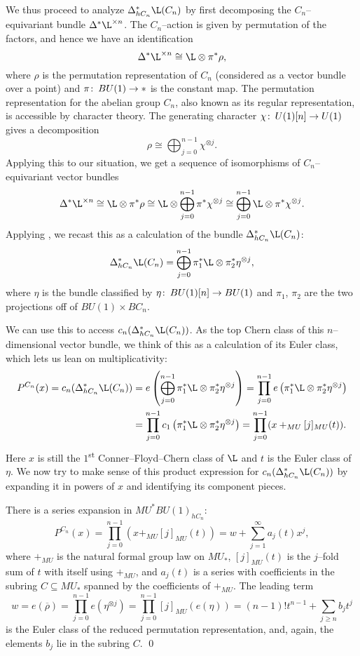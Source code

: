 We thus proceed to analyze \(\Delta^*_{hC_n} \L(C_n)\) by first decomposing the \(C_n\)--equivariant bundle \(\Delta^* \L^{\times n}\).  The \(C_n\)--action is given by permutation of the factors, and hence we have an identification \[\Delta^* \L^{\times n} \cong \L \otimes \pi^* \rho,\] where \(\rho\) is the permutation representation of \(C_n\) (considered as a vector bundle over a point) and \(\pi\colon\thinspace BU(1) \to *\) is the constant map.  The permutation representation for the abelian group \(C_n\), also known as its regular representation, is accessible by character theory.  The generating character \(\chi\colon\thinspace U(1)[n] \to U(1)\) gives a decomposition \[\rho \cong \bigoplus_{j=0}^{n-1} \chi^{\otimes j}.\]  Applying this to our situation, we get a sequence of isomorphisms of \(C_n\)--equivariant vector bundles \[\Delta^* \L^{\times n} \cong \L \otimes \pi^* \rho \cong \L \otimes \bigoplus_{j=0}^{n-1} \pi^* \chi^{\otimes j} \cong \bigoplus_{j=0}^{n-1} \L \otimes \pi^* \chi^{\otimes j}.\]  Applying , we recast this as a calculation of the bundle \(\Delta_{hC_n}^* \L(C_n)\): \[\Delta_{hC_n}^* \L(C_n) = \bigoplus_{j=0}^{n-1} \pi_1^* \L \otimes \pi_2^* \eta^{\otimes j},\] where \(\eta\) is the bundle classified by \(\eta\colon\thinspace BU(1)[n] \to BU(1)\) and \(\pi_1\), \(\pi_2\) are the two projections off of \(BU(1) \times BC_n\).

We can use this to access \(c_n(\Delta_{hC_n}^* \L(C_n))\).  As the top Chern class of this \(n\)--dimensional vector bundle, we think of this as a calculation of its Euler class, which lets us lean on multiplicativity:
\begin{align*}
P^{C_n}(x) = c_n(\Delta_{hC_n}^* \L(C_n)) & = e\left( \bigoplus_{j=0}^{n-1} \pi_1^* \L \otimes \pi_2^* \eta^{\otimes j} \right)
= \prod_{j=0}^{n-1} e\left( \pi_1^* \L \otimes \pi_2^* \eta^{\otimes j} \right) \\
& = \prod_{j=0}^{n-1} c_1\left( \pi_1^* \L \otimes \pi_2^* \eta^{\otimes j} \right)
= \prod_{j=0}^{n-1} (x +_{MU} [j]_{MU}(t)).
\end{align*}
Here \(x\) is still the \(1\)\textsuperscript{st} Conner--Floyd--Chern class of \(\L\) and \(t\) is the Euler class of \(\eta\).  We now try to make sense of this product expression for \(c_n(\Delta_{hC_n}^* \L(C_n))\) by expanding it in powers of \(x\) and identifying its component pieces.
\begin{lemma}\label{AjAndBjAreInTheFGLSubring}
There is a series expansion in \(MU^* BU(1)_{hC_n}\): \[P^{C_n}(x) = \prod_{j=0}^{n-1} (x +_{MU} [j]_{MU}(t)) = w + \sum_{j=1}^\infty a_j(t) x^j,\] where \(+_{MU}\) is the natural formal group law on \(MU_*\), \([j]_{MU}(t)\) is the \(j\)--fold sum of \(t\) with itself using \(+_{MU}\), and \(a_j(t)\) is a series with coefficients in the subring \(C \subseteq MU_*\) spanned by the coefficients of \(+_{MU}\).  The leading term \[w = e(\overline \rho) = \prod_{j=0}^{n-1} e(\eta^{\otimes j}) = \prod_{j=0}^{n-1} [j]_{MU} (e(\eta)) = (n-1)! t^{n-1} + \sum_{j \ge n} b_j t^j\] is the Euler class of the reduced permutation representation, and, again, the elements \(b_j\) lie in the subring \(C\). \qed
\end{lemma}

